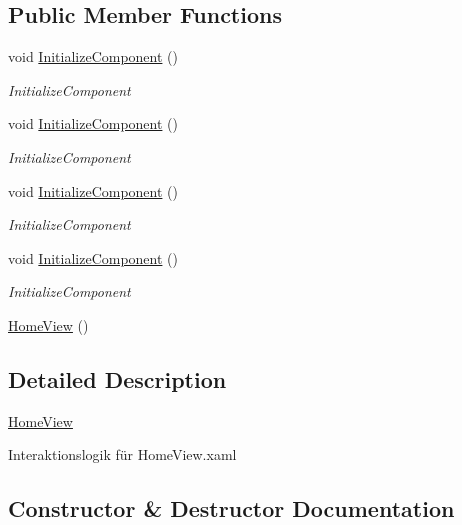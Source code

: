 \subsection*{Public Member Functions}
\begin{DoxyCompactItemize}
\item 
void \hyperlink{class_rowing_monitor_1_1_view_1_1_home_view_af517b7b90bd5fd7c31122f3058e32d4c}{Initialize\+Component} ()
\begin{DoxyCompactList}\small\item\em Initialize\+Component \end{DoxyCompactList}\item 
void \hyperlink{class_rowing_monitor_1_1_view_1_1_home_view_af517b7b90bd5fd7c31122f3058e32d4c}{Initialize\+Component} ()
\begin{DoxyCompactList}\small\item\em Initialize\+Component \end{DoxyCompactList}\item 
void \hyperlink{class_rowing_monitor_1_1_view_1_1_home_view_af517b7b90bd5fd7c31122f3058e32d4c}{Initialize\+Component} ()
\begin{DoxyCompactList}\small\item\em Initialize\+Component \end{DoxyCompactList}\item 
void \hyperlink{class_rowing_monitor_1_1_view_1_1_home_view_af517b7b90bd5fd7c31122f3058e32d4c}{Initialize\+Component} ()
\begin{DoxyCompactList}\small\item\em Initialize\+Component \end{DoxyCompactList}\item 
\hyperlink{class_rowing_monitor_1_1_view_1_1_home_view_a8b4e20793bd293f4e821c78b7f1d1281}{Home\+View} ()
\end{DoxyCompactItemize}


\subsection{Detailed Description}
\hyperlink{class_rowing_monitor_1_1_view_1_1_home_view}{Home\+View} 

Interaktionslogik für Home\+View.\+xaml 

\subsection{Constructor \& Destructor Documentation}
\mbox{\label{class_rowing_monitor_1_1_view_1_1_home_view_a8b4e20793bd293f4e821c78b7f1d1281}} 
